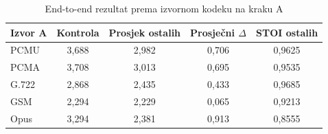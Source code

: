 \begin{table}[htbp]
\centering
\caption{End-to-end rezultat prema izvornom kodeku na kraku A}
\label{tab:e2e-by-source}
\small
\begin{tabular}{|l|c|c|c|c|}
\hline
\textbf{Izvor A} & \textbf{Kontrola} & \textbf{Prosjek ostalih} & \textbf{Prosječni $\Delta$} & \textbf{STOI ostalih} \\
\hline
PCMU  & 3,688 & 2,982 & 0,706 & 0,9625 \\
PCMA  & 3,708 & 3,013 & 0,695 & 0,9535 \\
G.722 & 2,868 & 2,435 & 0,433 & 0,9685 \\
GSM   & 2,294 & 2,229 & 0,065 & 0,9213 \\
Opus  & 3,294 & 2,381 & 0,913 & 0,8555 \\
\hline
\end{tabular}
\end{table}
